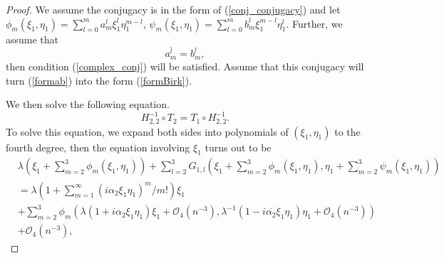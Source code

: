 \documentclass{article}
\numberwithin{figure}{section}
\numberwithin{equation}{section}
\theoremstyle{remark}
\theoremstyle{definition}
\begin{document}
\begin{proof}
We assume the conjugacy is in the form of (\ref{conj_conjugacy}) and let
\(\phi_{m}(\xi_1,\eta_1) = \sum_{l = 0}^{m}a_{m}^{l}\xi_1^{l}\eta_1^{m - l}\),
\(\psi_{m}(\xi_1,\eta_1) = \sum_{l = 0}^{m}b_{m}^{l}\xi_1^{m - l}\eta_1^{l}\). Further,  we assume that 
\begin{equation}\label{conj_relation}
\overline{a_{m}^{l}} = b_{m}^{l},
\end{equation}
then condition (\ref{complex_conj}) will be satisfied.
Assume that this conjugacy will turn (\ref{formab}) into the form (\ref{formBirk}).

 We then solve the following equation. 
\begin{equation}
	H_{2,2}^{-1}\circ T_2=T_1 \circ H_{2,2}^{-1}.
\end{equation}
To solve this equation, we expand both sides into polynomials of
\((\xi_1,\eta_1)\) to the fourth degree, then the equation involving \(\xi_1\) turns out to be
\begin{equation}\label{Birk_eq}
	\begin{split}
&\lambda\left( \xi_1 + \sum_{m = 2}^{3}{\phi_{m}(\xi_1,\eta_1)} \right) + \sum_{l = 2}^{3}G_{1,l} \left( \xi_1 + \sum_{m = 2}^{3}{\phi_{m}(\xi_1,\eta_1)},\eta_1 + \sum_{m = 2}^{3}{\psi_{m}(\xi_1,\eta_1)} \right)\\
 & = \lambda\left( 1 + \sum_{m=1}^{\infty}{\left(i\alpha_{2}\xi_1\eta_1\right)}^m/m!  \right)\xi_1  \\
 &+ \sum_{m = 2}^{3}{\phi_{m}\left( \lambda\left( 1 + i\alpha_{2}\xi_1\eta_1 \right)\xi_1 +\mathcal{O}_4(n^{-3}), \lambda^{- 1}\left( 1 - i\overline{\alpha_{2}}\xi_1\eta_1 \right)\eta_1 +\mathcal{O}_4(n^{-3}) \right)}\\
 &+\mathcal{O}_4(n^{-3}),
 \end{split}
\end{equation}


\end{proof}
\end{document}
